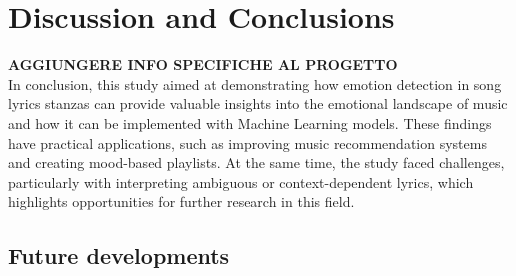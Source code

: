 \chapter*{Discussion and Conclusions}
\label{ch:conclusioni}

\textbf{AGGIUNGERE INFO SPECIFICHE AL PROGETTO}\\

In conclusion, this study aimed at demonstrating how emotion detection in song lyrics stanzas can provide valuable insights into the emotional landscape of music and how it can be implemented with Machine Learning models. 
These findings have practical applications, such as improving music recommendation systems and creating mood-based playlists. 
At the same time, the study faced challenges, particularly with interpreting ambiguous or context-dependent lyrics, which highlights opportunities for further research in this field.


\section*{Future developments}